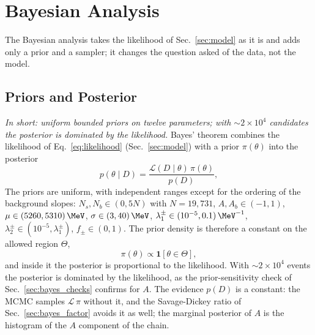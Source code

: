 \section{Bayesian Analysis}
\label{sec:bayesian}
The Bayesian analysis takes the likelihood of Sec.~\ref{sec:model} as it is and adds only a prior and a sampler; it changes the question asked of the data, not the model.

\subsection{Priors and Posterior}
\label{sec:bayes_prior}
\emph{In short: uniform bounded priors on twelve parameters; with $\sim2\times10^4$ candidates the posterior is dominated by the likelihood.}
Bayes' theorem combines the likelihood of Eq.~\eqref{eq:likelihood} (Sec.~\ref{sec:model}) with a prior $\pi(\theta)$ into the posterior
\begin{equation}
p(\theta\mid D)=\frac{\mathcal{L}(D\mid\theta)\,\pi(\theta)}{p(D)},
\label{eq:bayes}
\end{equation}
The priors are uniform, with independent ranges except for the ordering of the background slopes: $N_s,N_b\in(0,5N)$ with $N=19{,}731$, $A,A_b\in(-1,1)$, $\mu\in(5260,5310)\,\MeV$, $\sigma\in(3,40)\,\MeV$, $\lambda_1^{\pm}\in(10^{-5},0.1)\,\MeV^{-1}$, $\lambda_2^{\pm}\in(10^{-5},\lambda_1^{\pm})$, $f_{\pm}\in(0,1)$. The prior density is therefore a constant on the allowed region $\Theta$,
\begin{equation}
\pi(\theta)\propto\mathbf{1}\left[\theta\in\Theta\right],
\label{eq:prior}
\end{equation}
and inside it the posterior is proportional to the likelihood. With $\sim$$2\times10^4$ events the posterior is dominated by the likelihood, as the prior-sensitivity check of Sec.~\ref{sec:bayes_checks} confirms for $A$. The evidence $p(D)$ is a constant: the MCMC samples $\mathcal{L}\,\pi$ without it, and the Savage-Dickey ratio of Sec.~\ref{sec:bayes_factor} avoids it as well; the marginal posterior of $A$ is the histogram of the $A$ component of the chain.

